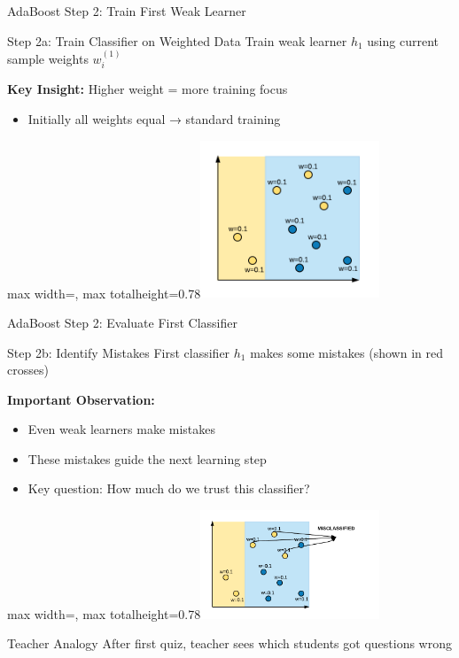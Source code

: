 \documentclass[8pt]{beamer}
\newcommand{\fitpic}[1]{\begin{adjustbox}{max width=\linewidth, max totalheight=0.78\textheight}#1\end{adjustbox}}
\begin{document}
\begin{frame}{AdaBoost Step 2: Train First Weak Learner}
\begin{alertbox}{Step 2a: Train Classifier on Weighted Data}
Train weak learner $h_1$ using current sample weights $w_i^{(1)}$
\end{alertbox}

\begin{keypointsbox}
\textbf{Key Insight:} Higher weight = more training focus
\begin{itemize}
\item Initially all weights equal → standard training
\end{itemize}
\end{keypointsbox}

  \vspace{0.3cm}
  \centering
  \fitpic{\includegraphics[width = 0.4\textwidth]{../assets/ensemble/diagrams/ada_iter1}}
\end{frame}

\begin{frame}{AdaBoost Step 2: Evaluate First Classifier}
\begin{alertbox}{Step 2b: Identify Mistakes}
First classifier $h_1$ makes some mistakes (shown in red crosses)
\end{alertbox}

\begin{keypointsbox}
\textbf{Important Observation:}
\begin{itemize}
\item Even weak learners make mistakes
\item These mistakes guide the next learning step
\item Key question: How much do we trust this classifier?
\end{itemize}
\end{keypointsbox}

  \vspace{0.3cm}
  \centering
  \fitpic{\includegraphics[width = 0.4\textwidth]{../assets/ensemble/diagrams/ada_iter1_misclassify}}

\begin{examplebox}{Teacher Analogy}
After first quiz, teacher sees which students got questions wrong
\end{examplebox}
\end{frame}
\end{document}
